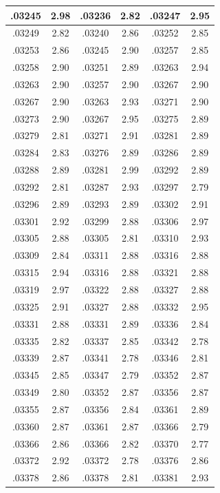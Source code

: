 \documentclass[10pt,twoside]{report}
\begin{document}
\begin{appendices}
\begin{longtable}{|c|c||c|c||c|c|}
.03245 & 2.98 & .03236 & 2.82 & .03247 & 2.95\\\hline
.03249 & 2.82 & .03240 & 2.86 & .03252 & 2.85\\\hline
.03253 & 2.86 & .03245 & 2.90 & .03257 & 2.85\\\hline
.03258 & 2.90 & .03251 & 2.89 & .03263 & 2.94\\\hline
.03263 & 2.90 & .03257 & 2.90 & .03267 & 2.90\\\hline
.03267 & 2.90 & .03263 & 2.93 & .03271 & 2.90\\\hline
.03273 & 2.90 & .03267 & 2.95 & .03275 & 2.89\\\hline
.03279 & 2.81 & .03271 & 2.91 & .03281 & 2.89\\\hline
.03284 & 2.83 & .03276 & 2.89 & .03286 & 2.89\\\hline
.03288 & 2.89 & .03281 & 2.99 & .03292 & 2.89\\\hline
.03292 & 2.81 & .03287 & 2.93 & .03297 & 2.79\\\hline
.03296 & 2.89 & .03293 & 2.89 & .03302 & 2.91\\\hline
.03301 & 2.92 & .03299 & 2.88 & .03306 & 2.97\\\hline
.03305 & 2.88 & .03305 & 2.81 & .03310 & 2.93\\\hline
.03309 & 2.84 & .03311 & 2.88 & .03316 & 2.88\\\hline
.03315 & 2.94 & .03316 & 2.88 & .03321 & 2.88\\\hline
.03319 & 2.97 & .03322 & 2.88 & .03327 & 2.88\\\hline
.03325 & 2.91 & .03327 & 2.88 & .03332 & 2.95\\\hline
.03331 & 2.88 & .03331 & 2.89 & .03336 & 2.84\\\hline
.03335 & 2.82 & .03337 & 2.85 & .03342 & 2.78\\\hline
.03339 & 2.87 & .03341 & 2.78 & .03346 & 2.81\\\hline
.03345 & 2.85 & .03347 & 2.79 & .03352 & 2.87\\\hline
.03349 & 2.80 & .03352 & 2.87 & .03356 & 2.87\\\hline
.03355 & 2.87 & .03356 & 2.84 & .03361 & 2.89\\\hline
.03360 & 2.87 & .03361 & 2.87 & .03366 & 2.79\\\hline
.03366 & 2.86 & .03366 & 2.82 & .03370 & 2.77\\\hline
.03372 & 2.92 & .03372 & 2.78 & .03376 & 2.86\\\hline
.03378 & 2.86 & .03378 & 2.81 & .03381 & 2.93\\\hline

\end{longtable}
\end{appendices}
\end{document}
